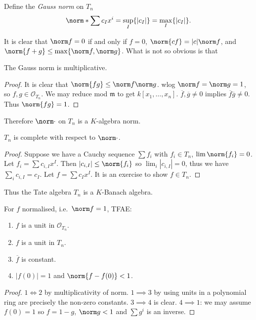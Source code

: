 \documentclass[a4paper]{article}
\begin{document}
Define the \emph{Gauss norm} on \(T_n\)
\[
  \norm*{\sum c_I x^i} = \sup_I \{|c_I|\} = \max_I \{|c_I|\}.
\]

It is clear that \(\norm f = 0\) if and only if \(f = 0\), \(\norm{cf} = |c| \norm f\), and \(\norm{f + g} \leq \max\{\norm f, \norm g\}\). What is not so obvious is that

\begin{lemma}
  The Gauss norm is multiplicative.
\end{lemma}

\begin{proof}
  It is clear that \(\norm{fg} \leq \norm f \norm g\). wlog \(\norm f = \norm g = 1\), so \(f, g \in \mathcal O_{T_n}\). We may reduce mod \(\mathfrak m\) to get \(k[x_1, \dots, x_n]\). \(\overline f, \overline g \ne 0\) implies \(\overline f \overline g \ne 0\). Thus \(\norm{fg} = 1\).
\end{proof}

Therefore \(\norm \cdot\) on \(T_n\) is a \(K\)-algebra norm.

\begin{lemma}
  \(T_n\) is complete with respect to \(\norm \cdot\).
\end{lemma}

\begin{proof}
  Suppose we have a Cauchy sequence \(\sum f_i\) with \(f_i \in T_n\), \(\lim \norm{f_i} = 0\). Let \(f_i = \sum c_{i, I} x^I\). Then \(|c_{i, I}| \leq \norm{f_i}\) so \(\lim_i |c_{i, I}| = 0\), thus we have \(\sum_i c_{i, I} = c_I\). Let \(f = \sum c_I x^I\). It is an exercise to show \(f \in T_n\).
\end{proof}

Thus the Tate algebra \(T_n\) is a \(K\)-Banach algebra.

\begin{lemma}
  For \(f\) normalised, i.e.\ \(\norm f = 1\), TFAE:
  \begin{enumerate}
  \item \(f\) is a unit in \(\mathcal O_{T_n}\).
  \item \(f\) is a unit in \(T_n\).
  \item \(\overline f\) is constant.
  \item \(|f(0)| = 1\) and \(\norm{f - f(0)} < 1\).
  \end{enumerate}
\end{lemma}

\begin{proof}
  \(1 \iff 2\) by multiplicativity of norm. \(1 \implies 3\) by using units in a polynomial ring are precisely the non-zero constants. \(3 \implies 4\) is clear. \(4 \implies 1\): we may assume \(f(0) = 1\) so \(f = 1 - g\), \(\norm g < 1\) and \(\sum g^i\) is an inverse.
\end{proof}
\end{document}
